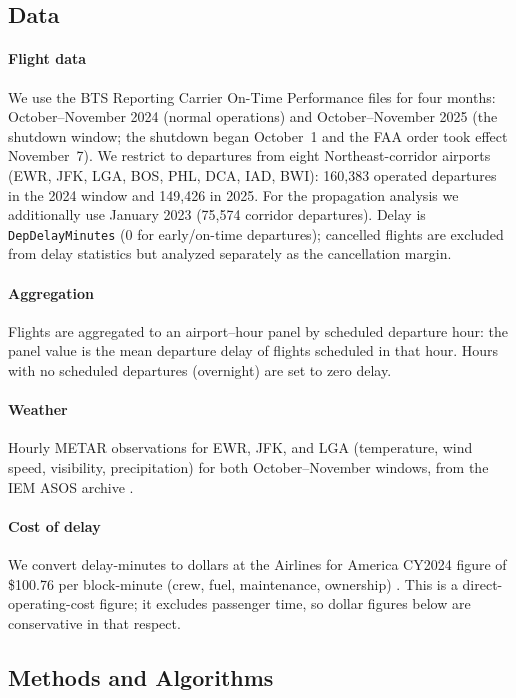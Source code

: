 \documentclass[10pt,journal]{IEEEtran}
\begin{document}
\subsection{Data}
\label{sec:data}
\paragraph{Flight data}
We use the BTS Reporting Carrier On-Time Performance files \cite{btsontime} for
four months: October--November 2024 (normal operations) and October--November
2025 (the shutdown window; the shutdown began October~1 and the FAA order took
effect November~7). We restrict to departures from eight Northeast-corridor
airports (EWR, JFK, LGA, BOS, PHL, DCA, IAD, BWI): 160,383 operated departures
in the 2024 window and 149,426 in 2025. For the propagation analysis we
additionally use January 2023 (75,574 corridor departures). Delay is
\texttt{DepDelayMinutes} (0 for early/on-time departures); cancelled flights are
excluded from delay statistics but analyzed separately as the cancellation
margin.

\paragraph{Aggregation}
Flights are aggregated to an airport--hour panel by scheduled departure hour:
the panel value is the mean departure delay of flights scheduled in that hour.
Hours with no scheduled departures (overnight) are set to zero delay.

\paragraph{Weather}
Hourly METAR observations for EWR, JFK, and LGA (temperature, wind speed,
visibility, precipitation) for both October--November windows, from the IEM
ASOS archive \cite{iemasos}.

\paragraph{Cost of delay}
We convert delay-minutes to dollars at the Airlines for America CY2024 figure
of \$100.76 per block-minute (crew, fuel, maintenance, ownership)
\cite{a4a2025}. This is a direct-operating-cost figure; it excludes passenger
time, so dollar figures below are conservative in that respect.

\subsection{Methods and Algorithms}
\label{sec:algorithms}
\end{document}
